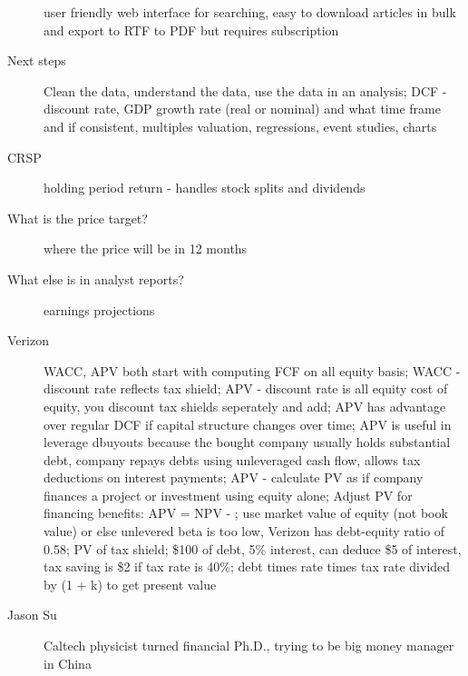 \documentclass[11pt]{article}
\begin{document}
\begin{description}
  user friendly web interface for searching, easy to download articles in bulk and export to RTF to PDF but requires subscription
\item[Next steps]
  Clean the data, understand the data, use the data in an analysis;
  DCF - discount rate, GDP growth rate (real or nominal) and what time frame and if consistent, multiples valuation, regressions, event studies, charts
\item[CRSP]
  holding period return - handles stock splits and dividends
\item[What is the price target?]
  where the price will be in 12 months
\item[What else is in analyst reports?]
  earnings projections
\item[Verizon]
  WACC, APV both start with computing FCF on all equity basis;
  WACC - discount rate reflects tax shield;
  APV - discount rate is all equity cost of equity, you discount tax shields seperately and add;
  APV has advantage over regular DCF if capital structure changes over time;
  APV is useful in leverage dbuyouts because the bought company usually holds substantial debt, company repays debts using unleveraged cash flow, allows tax deductions on interest payments;
  APV - calculate PV as if company finances a project or investment using equity alone;
  Adjust PV for financing benefits: APV = NPV - ;
  use market value of equity (not book value) or else unlevered beta is too low, Verizon has debt-equity ratio of 0.58;
  PV of tax shield; \$100 of debt, 5\% interest, can deduce \$5 of interest, tax saving is \$2 if tax rate is 40\%; debt times rate times tax rate divided by (1 + k) to get present value
\item[Jason Su]
  Caltech physicist turned financial Ph.D., trying to be big money manager in China
\end{description}
\end{document}
